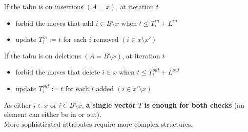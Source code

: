 If the tabu is on insertions $(A = x)$, at iteration $t$
\begin{itemize}
	\item forbid the moves that add $i \in B \setminus x$ when $t \leq T_i^{in} + L^{in}$
	
	\item update $T_i^{in} := t$ for each $i$ removed $(i \in x \setminus x')$
\end{itemize}

If the tabu is on deletions $(A = B \setminus x)$, at iteration $t$
\begin{itemize}
	\item forbid the moves that delete $i \in x$ when $t \leq T_i^{out} + L^{out}$
	
	\item update $T_i^{out} := t$ for each $i$ added $(i \in x' \setminus x)$
\end{itemize}

As either $i \in x$ or $i \in B \setminus x$, \textbf{a single vector} $T$ \textbf{is enough for both checks} (an element can either be in or out).\\

More sophisticated attributes require more complex structures.\\

\newpage

